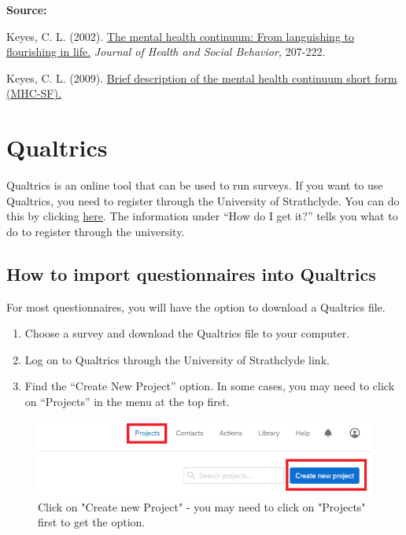 \documentclass[
]{book}
\providecommand{\tightlist}{%
  \setlength{\itemsep}{0pt}\setlength{\parskip}{0pt}}
\begin{document}
\textbf{Source:}

Keyes, C. L. (2002). \href{https://www.researchgate.net/profile/Corey_Keyes/publication/11278728_The_Mental_Health_Continuum_From_Languishing_to_Flourishing_in_Life/links/0046352b1a6f89da77000000/The-Mental-Health-Continuum-From-Languishing-to-Flourishing-in-Life.pdf}{The mental health continuum: From languishing to flourishing in life.} \emph{Journal of Health and Social Behavior,} 207-222.

Keyes, C. L. (2009). \href{https://www.aacu.org/sites/default/files/MHC-SFEnglish.pdf}{Brief description of the mental health continuum short form (MHC-SF).}

\hypertarget{qualtrics}{%
\chapter{Qualtrics}\label{qualtrics}}

Qualtrics is an online tool that can be used to run surveys. If you want to use Qualtrics, you need to register through the University of Strathclyde. You can do this by clicking \href{https://www.strath.ac.uk/is/software/qualtrics/}{here}. The information under ``How do I get it?'' tells you what to do to register through the university.

\hypertarget{how-to-import-questionnaires-into-qualtrics}{%
\section{How to import questionnaires into Qualtrics}\label{how-to-import-questionnaires-into-qualtrics}}

For most questionnaires, you will have the option to download a Qualtrics file.

\begin{enumerate}
\def\labelenumi{\arabic{enumi}.}
\tightlist
\item
  Choose a survey and download the Qualtrics file to your computer.
\item
  Log on to Qualtrics through the University of Strathclyde link.
\item
  Find the ``Create New Project'' option. In some cases, you may need to click on ``Projects'' in the menu at the top first.
\end{enumerate}

\begin{figure}

{\centering \includegraphics[width=0.85\linewidth]{images/Qualtrics/02NewProject} 

}

\caption{Click on "Create new Project" - you may need to click on "Projects" first to get the option.}\label{fig:Figure11-2}
\end{figure}
\end{document}
